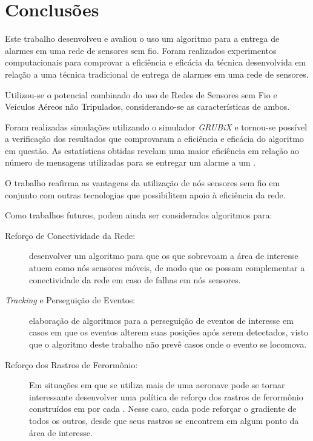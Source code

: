 \newpage\section{Conclusões}
\label{chap:Conclusões}

Este trabalho desenvolveu e avaliou o uso um algoritmo para a entrega de alarmes em uma rede de sensores sem fio. Foram realizados experimentos computacionais para comprovar a eficiência e eficácia da técnica desenvolvida em relação a uma técnica tradicional de entrega de alarmes em uma rede de sensores.

Utilizou-se o potencial combinado do uso de Redes de Sensores sem Fio e Veículos Aéreos não Tripulados, considerando-se as características de ambos.

Foram realizadas simulações utilizando o simulador \emph{GRUBiX} e tornou-se possível a verificação dos resultados que comprovaram a eficiência e eficácia do algoritmo em questão. As estatísticas obtidas revelam uma maior eficiência em relação ao número de mensagens utilizadas para se entregar um alarme a um \vant.

O trabalho reafirma as vantagens da utilização de nós sensores sem fio em conjunto com outras tecnologias que possibilitem apoio à eficiência da rede.

Como trabalhos futuros, podem ainda ser considerados algoritmos para:

\begin{description}
	\item[Reforço de Conectividade da Rede:] desenvolver um algoritmo para que os \vants que sobrevoam a área de interesse atuem como nós sensores móveis, de modo que os \vants possam complementar a conectividade da rede em caso de falhas em nós sensores.
	
	\item[\emph{Tracking} e Perseguição de Eventos: ] elaboração de algoritmos para a perseguição de eventos de interesse em casos em que os eventos alterem suas posições após serem detectados, visto que o algoritmo deste trabalho não prevê casos onde o evento se locomova.

	\item[Reforço dos Rastros de Ferormônio:] Em situações em que se utiliza mais de uma aeronave pode se tornar interessante desenvolver uma política de reforço dos rastros de ferormônio construídos em por cada \vant. Nesse caso, cada \vant pode reforçar o gradiente de todos os outros, desde que seus rastros se encontrem em algum ponto da área de interesse.
\end{description}
\newpage